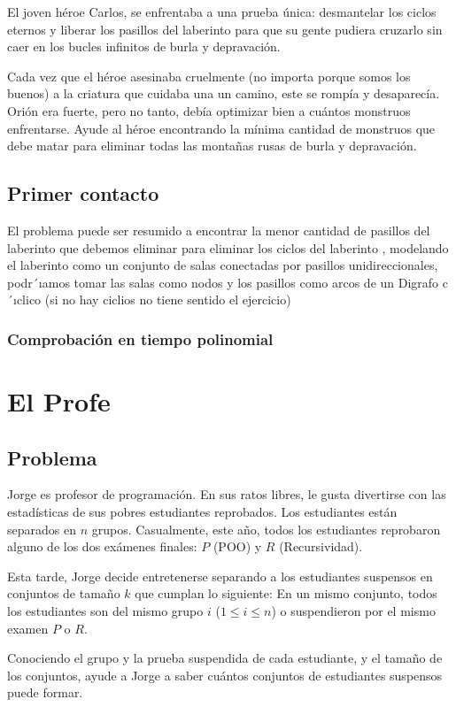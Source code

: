 \documentclass{article}
\begin{document}
El joven héroe Carlos, se enfrentaba a una prueba única: desmantelar los ciclos eternos y liberar los pasillos del laberinto para que su gente pudiera cruzarlo sin caer en los bucles infinitos de burla y depravación.

Cada vez que el héroe asesinaba cruelmente (no importa porque somos los buenos) a la criatura que cuidaba una un camino, este se rompía y desaparecía. Orión era fuerte, pero no tanto, debía optimizar bien a cuántos monstruos enfrentarse. Ayude al héroe encontrando la mínima cantidad de monstruos que debe matar para eliminar todas las montañas rusas de burla y depravación.
	\subsection{Primer contacto}
	El problema puede ser resumido a encontrar la menor cantidad de pasillos del
laberinto que debemos eliminar para eliminar los ciclos del laberinto , modelando el laberinto como un conjunto de salas conectadas por pasillos unidireccionales, podr´ıamos tomar las salas como nodos y los pasillos como arcos de un Digrafo c´ıclico (si no hay ciclios no tiene sentido el ejercicio)
	\subsubsection{Comprobación en tiempo polinomial}
	
	\section{El Profe}

	\subsection{Problema}
	Jorge es profesor de programación. En sus ratos libres, le gusta divertirse con las estadísticas de sus pobres estudiantes reprobados. Los estudiantes están separados en $n$ grupos. Casualmente, este año, todos los estudiantes reprobaron alguno de los dos exámenes finales: $P$ (POO) y $R$ (Recursividad).

Esta tarde, Jorge decide entretenerse separando a los estudiantes suspensos en conjuntos de tamaño $k$ que cumplan lo siguiente: En un mismo conjunto, todos los estudiantes son del mismo grupo $i$ ($1 \leq i \leq n$) o suspendieron por el mismo examen $P$ o $R$.

Conociendo el grupo y la prueba suspendida de cada estudiante, y el tamaño de los conjuntos, ayude a Jorge a saber cuántos conjuntos de estudiantes suspensos puede formar.
\end{document}
